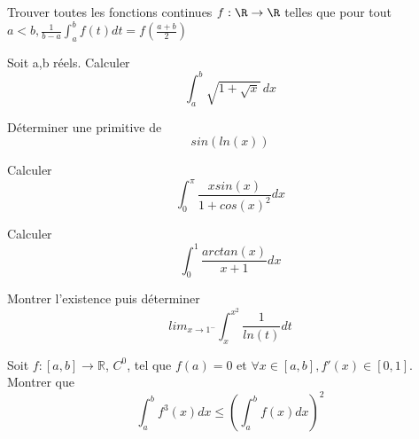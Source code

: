 \documentclass[11pt,a4paper]{article}
\begin{document}
\begin{exercise}
Trouver toutes les fonctions continues $f:\R\to\R$ telles que
pour tout $a\lt b, \frac{1}{b-a}\int_a^bf(t)dt=f\left(\frac{a+b}{2}\right)$
\end{exercise}

\begin{exercise}
Soit a,b réels. Calculer
\[\int_a^b\sqrt{1+\sqrt x}\,dx\]
\end{exercise}
\begin{exercise}
Déterminer une primitive de $$sin(ln(x))$$

\end{exercise}
\begin{exercise}
Calculer $$\int_0^{\pi}\frac{xsin(x)}{1+cos(x)^2}dx$$
\end{exercise}
\begin{exercise}
Calculer $$\int_0^1\frac{arctan(x)}{x+1}dx$$
\end{exercise}
\begin{exercise}
Montrer l'existence puis déterminer $$lim_{x\rightarrow 1^-}\int_x^{x^2}\frac1{ln(t)}dt$$
\end{exercise}
\begin{exercise}
Soit $f : [a,b]\rightarrow \mathbb R$, $C^0$, tel que $f(a)=0$ et $\forall x\in[a,b], f'(x)\in[0,1]$.
Montrer que $$\int_a^b f^3(x)dx\le(\int_a^b f(x)dx)^2$$
\end{exercise}
\end{document}
